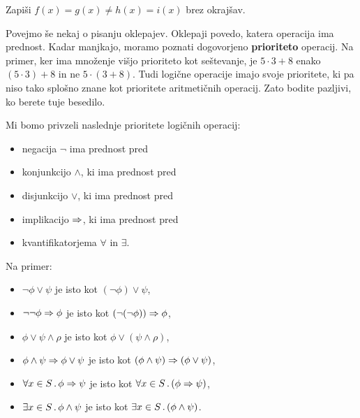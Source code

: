 \begin{naloga}
  Zapiši $f(x) = g(x) \neq h(x) = i(x)$ brez okrajšav.
\end{naloga}

Povejmo še nekaj o pisanju oklepajev. Oklepaji povedo, katera
operacija ima prednost. Kadar manjkajo, moramo poznati dogovorjeno
\textbf{prioriteto} operacij. Na primer, ker ima množenje višjo
prioriteto kot seštevanje, je $5 \cdot 3 + 8$ enako $(5 \cdot 3) + 8$
in ne $5 \cdot (3 + 8)$. Tudi logične operacije imajo svoje
prioritete, ki pa niso tako splošno znane kot prioritete aritmetičnih
operacij. Zato bodite pazljivi, ko berete tuje besedilo.

Mi bomo privzeli naslednje prioritete logičnih operacij:
%
\begin{itemize}
\item negacija $\lnot$ ima prednost pred
\item konjunkcijo $\land$, ki ima prednost pred
\item disjunkcijo $\lor$, ki ima prednost pred
\item implikacijo $\Rightarrow$, ki ima prednost pred
\item kvantifikatorjema $\forall$ in $\exists$.
\end{itemize}
%
Na primer:
%
\begin{itemize}
\item $\lnot \phi \lor \psi$ je isto kot $(\lnot \phi) \lor \psi$,
\item $\lnot \lnot \phi \Rightarrow \phi$ je isto kot $(\lnot(\lnot\phi))
  \Rightarrow \phi$,
\item $\phi \lor \psi \land \rho$ je isto kot $\phi \lor (\psi \land \rho)$,
\item $\phi \land \psi \Rightarrow \phi \lor \psi$ je isto kot $(\phi
  \land \psi) \Rightarrow (\phi \lor \psi)$,
\item $\forall x \in S \,.\, \phi \Rightarrow \psi$ je isto kot $\forall x \in S \,.\, (\phi
    \Rightarrow \psi)$,
\item $\exists x \in S \,.\, \phi \land \psi$ je isto kot $\exists x \in S \,.\, (\phi
    \land \psi)$.
\end{itemize}

